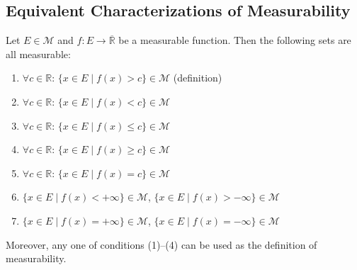 \documentclass[11pt]{report}
\begin{document}
\subsection{Equivalent Characterizations of Measurability}

\begin{propbox}
Let $E \in \mathcal{M}$ and $f: E \to \overline{\mathbb{R}}$ be a measurable function. Then the following sets are all measurable:
\begin{enumerate}
    \item $\forall c \in \mathbb{R}$: $\{x \in E \mid f(x) > c\} \in \mathcal{M}$ \quad (definition)
    \item $\forall c \in \mathbb{R}$: $\{x \in E \mid f(x) < c\} \in \mathcal{M}$
    \item $\forall c \in \mathbb{R}$: $\{x \in E \mid f(x) \leq c\} \in \mathcal{M}$
    \item $\forall c \in \mathbb{R}$: $\{x \in E \mid f(x) \geq c\} \in \mathcal{M}$
    \item $\forall c \in \mathbb{R}$: $\{x \in E \mid f(x) = c\} \in \mathcal{M}$
    \item $\{x \in E \mid f(x) < +\infty\} \in \mathcal{M}$, \quad $\{x \in E \mid f(x) > -\infty\} \in \mathcal{M}$
    \item $\{x \in E \mid f(x) = +\infty\} \in \mathcal{M}$, \quad $\{x \in E \mid f(x) = -\infty\} \in \mathcal{M}$
\end{enumerate}
Moreover, any one of conditions (1)--(4) can be used as the definition of measurability.
\end{propbox}
\end{document}
